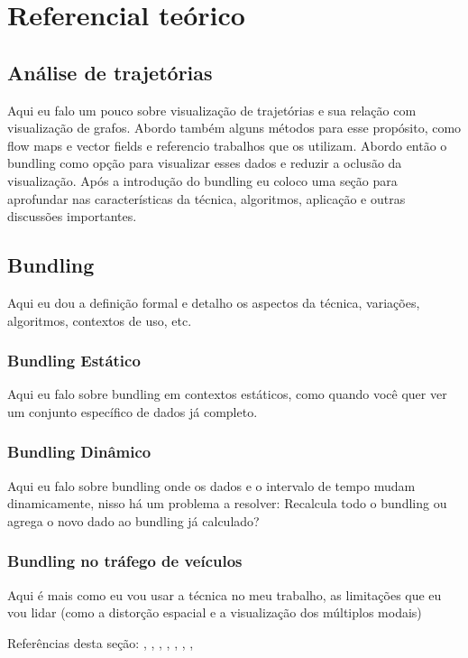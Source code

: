 \chapter{Referencial teórico}
\label{cap:referencial-teorico}

\section{Análise de trajetórias}

Aqui eu falo um pouco sobre visualização de trajetórias e sua relação com
visualização de grafos. Abordo também alguns métodos para esse propósito, como
flow maps e vector fields e referencio trabalhos que os utilizam. Abordo então
o bundling como opção para visualizar esses dados e reduzir a oclusão da visualização.
Após a introdução do bundling eu coloco uma seção para aprofundar nas características
da técnica, algoritmos, aplicação e outras discussões importantes.

\section{Bundling}
    Aqui eu dou a definição formal e detalho os aspectos da técnica, variações,
algoritmos, contextos de uso, etc.

\subsection{Bundling Estático}
    Aqui eu falo sobre bundling em contextos estáticos, como quando você quer
ver um conjunto específico de dados já completo.

\subsection{Bundling Dinâmico}
    Aqui eu falo sobre bundling onde os dados e o intervalo de tempo mudam
dinamicamente, nisso há um problema a resolver: Recalcula todo o bundling ou
agrega o novo dado ao bundling já calculado?

\subsection{Bundling no tráfego de veículos}
    Aqui é mais como eu vou usar a técnica no meu trabalho, as limitações que
eu vou lidar (como a distorção espacial e a visualização dos múltiplos modais)

Referências desta seção: \cite{Selassie2011}, \cite{Hurter2013},  \cite{Zhou2013},
\cite{Anita2017}, \cite{VanDerZwan2016}, \cite{Andrienko2017}, \cite{Lhuillier2017},
\cite{Hurter2018}


